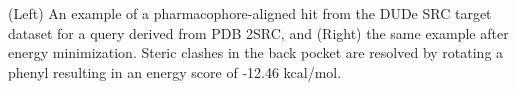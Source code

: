 \label{minfig} (Left) An example of a pharmacophore-aligned hit from the DUDe SRC target dataset for a query derived from PDB 2SRC, and (Right) the same example after energy minimization. Steric clashes in the back pocket are resolved by rotating a phenyl resulting in an energy score of -12.46 kcal/mol.